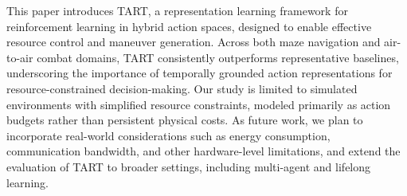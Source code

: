This paper introduces TART, a representation learning framework for reinforcement learning in hybrid action spaces, designed to enable effective resource control and maneuver generation.
Across both maze navigation and air-to-air combat domains, TART consistently outperforms representative baselines, underscoring the importance of temporally grounded action representations for resource-constrained decision-making.
Our study is limited to simulated environments with simplified resource constraints, modeled primarily as action budgets rather than persistent physical costs.
As future work, we plan to incorporate real-world considerations such as energy consumption, communication bandwidth, and other hardware-level limitations, and extend the evaluation of TART to broader settings, including multi-agent and lifelong learning.